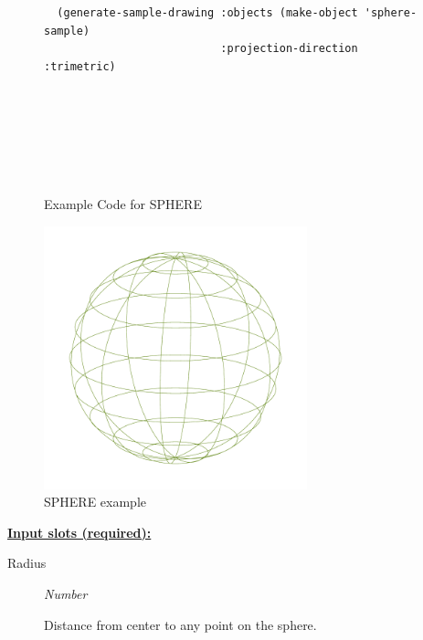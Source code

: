 \documentclass [11pt]{book}
\begin{document}
\begin{itemize}
\begin{figure}
\begin{lrbox}{\boxedverb}
\begin{minipage}{\linewidth}
{\begin{verbatim}
  (generate-sample-drawing :objects (make-object 'sphere-sample) 
                           :projection-direction :trimetric)





                  

\end{verbatim}}
\end{minipage}
\end{lrbox}
\fbox{\usebox{\boxedverb}}

\caption{Example Code for SPHERE}

\label{fig:example-code-SPHERE}

\end{figure}

\begin{figure}
\begin{center}
\includegraphics[width=3in,height=3in]{../images/example-SPHERE.pdf}
\end{center}

\caption{SPHERE example}

\label{fig:SPHERE}

\end{figure}





\textbf{
\underline{Input slots (required):}}

\begin{description}

\item [Radius]
\emph{Number}

 Distance from center to any point on the sphere.




\end{description}







\end{itemize}
\end{document}
